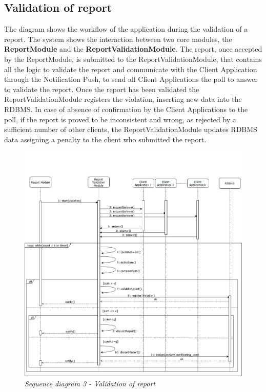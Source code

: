 \subsection{Validation of report}
The diagram shows the workflow of the application during the validation of a report. The system shows the interaction between two core 
modules, the \textbf{ReportModule} and the \textbf{ReportValidationModule}. The report, once accepted by the ReportModule, is submitted to
the ReportValidationModule, that contains all the logic to validate the report and communicate with the Client Application through the Notification
Push, to send all Client Applications the poll to answer to validate the report. Once the report has been validated the ReportValidationModule
registers the violation, inserting new data into the RDBMS. In case of absence of confirmation by the Client Applications to the poll, if the 
report is proved to be inconsistent and wrong, as rejected by a sufficient number of other clients, the ReportValidationModule updates RDBMS data 
assigning a penalty to the client who submitted the report.

\begin{figure}[H]
  \centering
  \includegraphics[width=\textwidth]{DD_Images/RuntimeView/3.jpg}
  \caption{\textit{Sequence diagram 3 - Validation of report}}
\end{figure}

